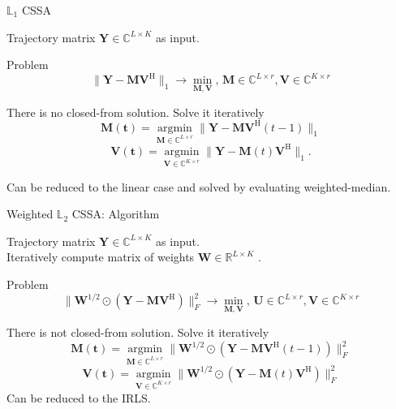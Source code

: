\documentclass[ucs, notheorems, handout]{beamer}
\DeclareMathOperator*{\argmin}{argmin}
\begin{document}
\begin{frame}{$\mathbb{L}_1$ CSSA}

Trajectory matrix $\mathbf{Y} \in \mathbb{C}^{L\times K}$ as input.
\begin{block}{Problem}
\begin{equation*}
	\|\mathbf{Y}-\mathbf{M}\mathbf{V}^{\mathrm{H}}\|_1 \longrightarrow \min_{\mathbf{M},\mathbf{V}}, \, \mathbf{M} \in \mathbb{C}^{L\times r}, \mathbf{V} \in \mathbb{C}^{K\times r}
\end{equation*}
\end{block}
There is no closed-from solution. Solve it iteratively 
\begin{equation*}
	 \mathbf{M(t)} = \argmin\limits_{\mathbf{M}\in \mathbb{C}^{L\times r}} \|\mathbf{Y} - \mathbf{M}\mathbf{V}^\mathrm{H}(t - 1)\|_1
\end{equation*}
$$\mathbf{V(t)} = \argmin\limits_{\mathbf{V}\in \mathbb{C}^{K\times r}} \|\mathbf{Y} - \mathbf{M}(t)\mathbf{V}^\mathrm{H}\|_1.$$

Can be reduced to the linear case and solved by evaluating weighted-median.

    \note{}
\end{frame}


\begin{frame}{Weighted $\mathbb{L}_2$ CSSA: Algorithm}

Trajectory matrix $\mathbf{Y} \in \mathbb{C}^{L\times K}$ as input.\\ 
\vspace{1em}
Iteratively compute matrix of weights $\mathbf{W} \in \mathbb{R}^{L\times K}$ .
\begin{block}{Problem}
\begin{equation*}
	\|\mathbf{W}^{1/2}\odot(\mathbf{Y}-\mathbf{M}\mathbf{V}^{\mathrm{H}})\|^{2}_F \longrightarrow \min_{\mathbf{M},\mathbf{V}}, \, \mathbf{U} \in \mathbb{C}^{L\times r}, \mathbf{V} \in \mathbb{C}^{K\times r}
\end{equation*}
\end{block}
There is not closed-from solution. Solve it iteratively
\begin{equation*}
	\mathbf{M(t)} = \argmin\limits_{\mathbf{M}\in \mathbb{C}^{L\times r}} \|\mathbf{W}^{1/2}\odot(\mathbf{Y}-\mathbf{M}\mathbf{V}^{\mathrm{H}}(t-1))\|^2_F
\end{equation*}
$$\mathbf{V(t)} = \argmin\limits_{\mathbf{V}\in \mathbb{C}^{K\times r}} \|\mathbf{W}^{1/2}\odot(\mathbf{Y}-\mathbf{M}(t)\mathbf{V}^{\mathrm{H}})\|^2_F$$
Can be reduced to the IRLS.

    \note{}
\end{frame}
\end{document}
